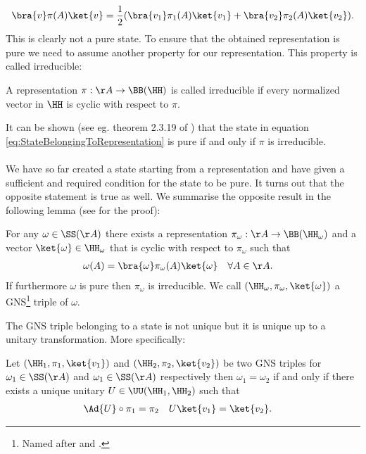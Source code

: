 \begin{equation}
\bra{v}\pi(A)\ket{v}=\frac{1}{2}(\bra{v_1}\pi_1(A)\ket{v_1}+\bra{v_2}\pi_2(A)\ket{v_2}).
\end{equation}
This is clearly not a pure state. To ensure that the obtained representation is pure we need to assume another property for our representation. This property is called irreducible:
\begin{definition}
	A representation $\pi:\AA\rightarrow \BB(\HH)$ is called irreducible if every normalized vector in $\HH$ is cyclic with respect to $\pi$.
\end{definition}
It can be shown (see eg. theorem 2.3.19 of \cite{bratteli1979operator}) that the state in equation \eqref{eq:StateBelongingToRepresentation} is pure if and only if $\pi$ is irreducible.\\\\
We have so far created a state starting from a representation and have given a sufficient and required condition for the state to be pure. It turns out that the opposite statement is true as well. We summarise the opposite result in the following lemma (see \cite{bratteli1979operator} for the proof):
\begin{lemma}
	For any $\omega\in\SS(\AA)$ there exists a representation $\pi_\omega:\AA\rightarrow\BB(\HH_\omega)$ and a vector $\ket{\omega}\in\HH_\omega$ that is cyclic with respect to $\pi_\omega$ such that
	\begin{align}
	\omega(A)&=\bra{\omega}\pi_\omega(A)\ket{\omega}&\forall A&\in\AA.
	\end{align}
	If furthermore $\omega$ is pure then $\pi_\omega$ is irreducible. We call $(\HH_\omega,\pi_\omega,\ket{\omega})$ a GNS\footnote{Named after \cite{gelfand1943imbedding} and \cite{segal1947irreducible}.} triple of $\omega$.
\end{lemma}
The GNS triple belonging to a state is not unique but it is unique up to a unitary transformation. More specifically:
\begin{lemma}\label{lem:UniquenessOfGNSTriple}
	Let $(\HH_1,\pi_1,\ket{v_1})$ and $(\HH_2,\pi_2,\ket{v_2})$ be two GNS triples for $\omega_1\in\SS(\AA)$ and $\omega_1\in\SS(\AA)$ respectively then $\omega_1=\omega_2$ if and only if there exists a unique unitary $U\in\UU(\HH_1,\HH_2)$ such that
	\begin{align}
	\Ad{U}\circ\pi_1&=\pi_2&U\ket{v_1}&=\ket{v_2}.
	\end{align}
\end{lemma}

